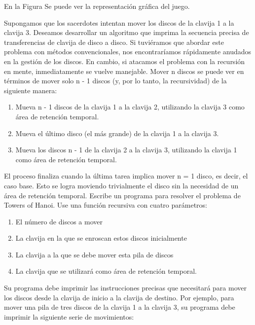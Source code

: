 En la Figura  Se puede ver la representación gráfica del juego.

Supongamos que los sacerdotes intentan mover los discos de la clavija 1 a la clavija 3. Deseamos desarrollar un algoritmo que imprima la secuencia precisa de transferencias de clavija de disco a disco.
Si tuviéramos que abordar este problema con métodos convencionales, nos encontraríamos rápidamente anudados en la gestión de los discos. En cambio, si atacamos el problema con la recursión en mente, inmediatamente se vuelve manejable. Mover n discos se puede ver en términos de mover solo n - 1 discos (y, por lo tanto, la recursividad) de la siguiente manera:
\begin{enumerate}
  \item Mueva n - 1 discos de la clavija 1 a la clavija 2, utilizando la clavija 3 como área de retención temporal.
  \item Mueva el último disco (el más grande) de la clavija 1 a la clavija 3.
  \item Mueva los discos n - 1 de la clavija 2 a la clavija 3, utilizando la clavija 1 como área de retención temporal.
\end{enumerate}
El proceso finaliza cuando la última tarea implica mover n = 1 disco, es decir, el caso base. Esto se logra moviendo trivialmente el disco sin la necesidad de un área de retención temporal.
Escribe un programa para resolver el problema de Towers of Hanoi. Use una función recursiva con cuatro parámetros:
\begin{enumerate}
  \item El número de discos a mover
  \item La clavija en la que se enroscan estos discos inicialmente
  \item La clavija a la que se debe mover esta pila de discos
  \item La clavija que se utilizará como área de retención temporal.
\end{enumerate}
Su programa debe imprimir las instrucciones precisas que necesitará para mover los discos desde la clavija de inicio a la clavija de destino. Por ejemplo, para mover una pila de tres discos de la clavija 1 a la clavija 3, su programa debe imprimir la siguiente serie de movimientos:

